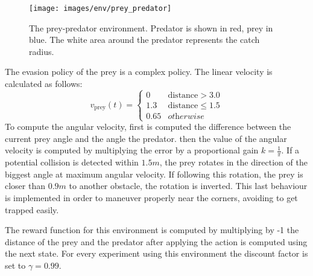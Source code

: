 \begin{figure}[t]
    \centering
    \texttt{[image: images/env/prey\_predator]}
    \caption[The Prey-Predator environment]{The prey-predator environment. Predator is shown in red, prey in blue. The white area around the predator represents the catch radius.}
    \label{fig:prey_predator_example}
\end{figure}


The evasion policy of the prey is a complex policy. The linear velocity is calculated as follows:
\begin{equation*}
v_{\text{prey}}(t)=\begin{cases}
0 & \text{distance} > 3.0\\
1.3 & \text{distance} \leq 1.5\\
0.65 & \textit{otherwise}
\end{cases}
\end{equation*}
To compute the angular velocity, first is computed the difference between the current prey angle and the angle \wrt the predator. then the value of the angular velocity is computed by multiplying the error by a proportional gain $k=\frac{1}{\pi}$. If a potential collision is detected within $1.5m$, the prey rotates in the direction of the biggest angle at maximum angular velocity. If following this rotation, the prey is closer than $0.9m$ to another obstacle, the rotation is inverted. This last behaviour is implemented in order to maneuver properly near the corners, avoiding to get trapped easily.

The reward function for this environment is computed by multiplying by -1 the distance of the prey and the predator after applying the action \ie is computed using the next state. For every experiment using this environment the discount factor is set to $\gamma=0.99$.


